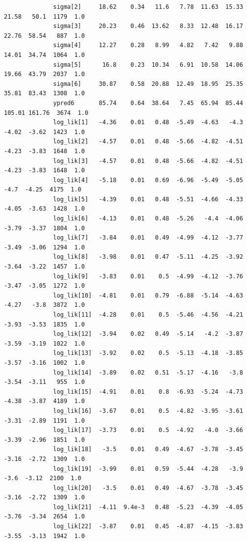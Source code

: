 \documentclass[11pt,a4paper,english]{article}
\begin{document}
\begin{itemize}
\begin{verbatim}
              sigma[2]     18.62    0.34   11.6   7.78  11.63  15.33  21.58   50.1  1179  1.0
              sigma[3]     20.23    0.46  13.62   8.33  12.48  16.17  22.76  58.54   887  1.0
              sigma[4]     12.27    0.28   8.99   4.82   7.42   9.88  14.01  34.74  1064  1.0
              sigma[5]      16.8    0.23  10.34   6.91  10.58  14.06  19.66  43.79  2037  1.0
              sigma[6]     30.87    0.58  20.88  12.49  18.95  25.35  35.81  83.43  1308  1.0
              ypred6       85.74    0.64  38.64   7.45  65.94  85.44 105.01 161.76  3674  1.0
              log_lik[1]   -4.36    0.01   0.48  -5.49  -4.63   -4.3  -4.02  -3.62  1423  1.0
              log_lik[2]   -4.57    0.01   0.48  -5.66  -4.82  -4.51  -4.23  -3.83  1648  1.0
              log_lik[3]   -4.57    0.01   0.48  -5.66  -4.82  -4.51  -4.23  -3.83  1648  1.0
              log_lik[4]   -5.18    0.01   0.69  -6.96  -5.49  -5.05   -4.7  -4.25  4175  1.0
              log_lik[5]   -4.39    0.01   0.48  -5.51  -4.66  -4.33  -4.05  -3.63  1428  1.0
              log_lik[6]   -4.13    0.01   0.48  -5.26   -4.4  -4.06  -3.79  -3.37  1804  1.0
              log_lik[7]   -3.84    0.01   0.49  -4.99  -4.12  -3.77  -3.49  -3.06  1294  1.0
              log_lik[8]   -3.98    0.01   0.47  -5.11  -4.25  -3.92  -3.64  -3.22  1457  1.0
              log_lik[9]   -3.83    0.01    0.5  -4.99  -4.12  -3.76  -3.47  -3.05  1272  1.0
              log_lik[10]  -4.81    0.01   0.79  -6.88  -5.14  -4.63  -4.27   -3.8  3872  1.0
              log_lik[11]  -4.28    0.01    0.5  -5.46  -4.56  -4.21  -3.93  -3.53  1835  1.0
              log_lik[12]  -3.94    0.02   0.49  -5.14   -4.2  -3.87  -3.59  -3.19  1022  1.0
              log_lik[13]  -3.92    0.02    0.5  -5.13  -4.18  -3.85  -3.57  -3.16  1002  1.0
              log_lik[14]  -3.89    0.02   0.51  -5.17  -4.16   -3.8  -3.54  -3.11   955  1.0
              log_lik[15]  -4.91    0.01    0.8  -6.93  -5.24  -4.73  -4.38  -3.87  4189  1.0
              log_lik[16]  -3.67    0.01    0.5  -4.82  -3.95  -3.61  -3.31  -2.89  1191  1.0
              log_lik[17]  -3.73    0.01    0.5  -4.92   -4.0  -3.66  -3.39  -2.96  1851  1.0
              log_lik[18]   -3.5    0.01   0.49  -4.67  -3.78  -3.45  -3.16  -2.72  1309  1.0
              log_lik[19]  -3.99    0.01   0.59  -5.44  -4.28   -3.9   -3.6  -3.12  2100  1.0
              log_lik[20]   -3.5    0.01   0.49  -4.67  -3.78  -3.45  -3.16  -2.72  1309  1.0
              log_lik[21]  -4.11  9.4e-3   0.48  -5.23  -4.39  -4.05  -3.76  -3.34  2654  1.0
              log_lik[22]  -3.87    0.01   0.45  -4.87  -4.15  -3.83  -3.55  -3.13  1942  1.0

\end{verbatim}
\end{itemize}
\end{document}

